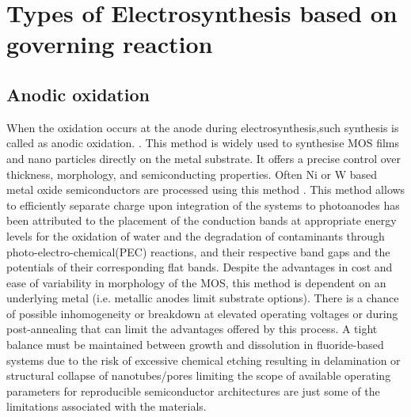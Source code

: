 \documentclass[12pt,a4paper]{report}
\begin{document}
	
	
	\section{Types of Electrosynthesis based on governing reaction}
	
	\subsection{Anodic oxidation}
	When the oxidation occurs at the anode during electrosynthesis,such synthesis is called as anodic oxidation. \cite{Li2024}. This method is widely used to synthesise MOS films and nano particles directly on the metal substrate. It offers a precise control over thickness, morphology, and semiconducting properties. Often Ni or W based metal oxide semiconductors are processed using this method \cite{Therese2000}. 
	This method allows to efficiently separate charge upon integration of the systems to photoanodes has been attributed to the placement of the conduction bands at appropriate energy levels for the oxidation of water and the degradation of contaminants through photo-electro-chemical(PEC) reactions, and their respective band gaps and the potentials of their corresponding flat bands. \cite{Zych2020} 
	Despite the advantages in cost and ease of variability in morphology of the MOS, this method is dependent on an underlying metal (i.e. metallic anodes limit substrate options). There is a chance of possible inhomogeneity or breakdown at elevated operating voltages or during post-annealing that can limit the advantages offered by this process. A tight balance must be maintained between growth and dissolution in fluoride-based systems due to the risk of excessive chemical etching resulting in delamination or structural collapse of nanotubes/pores limiting the scope of available operating parameters for reproducible semiconductor architectures are just some of the limitations associated with the materials. \cite{Chiang2025}
\end{document}
